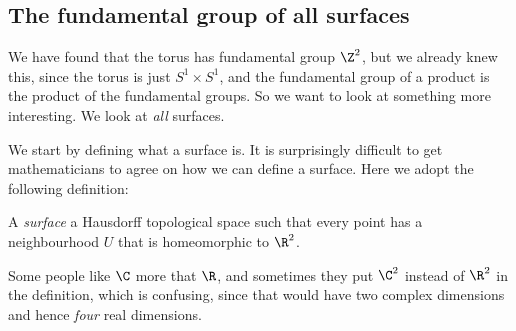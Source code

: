 \documentclass[a4paper]{article}
\begin{document}
\subsection{The fundamental group of all surfaces}
We have found that the torus has fundamental group $\Z^2$, but we already knew this, since the torus is just $S^1 \times S^1$, and the fundamental group of a product is the product of the fundamental groups. So we want to look at something more interesting. We look at \emph{all} surfaces.

We start by defining what a surface is. It is surprisingly difficult to get mathematicians to agree on how we can define a surface. Here we adopt the following definition:
\begin{defi}[Surface]
  A \emph{surface} a Hausdorff topological space such that every point has a neighbourhood $U$ that is homeomorphic to $\R^2$.
\end{defi}
Some people like $\C$ more that $\R$, and sometimes they put $\C^2$ instead of $\R^2$ in the definition, which is confusing, since that would have two complex dimensions and hence \emph{four} real dimensions.
\end{document}
